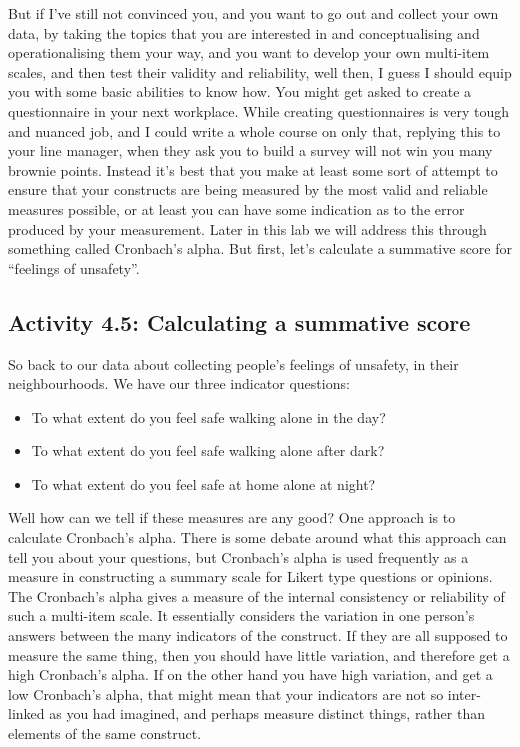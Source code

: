 \documentclass[
]{book}
\providecommand{\tightlist}{%
  \setlength{\itemsep}{0pt}\setlength{\parskip}{0pt}}
\begin{document}
But if I've still not convinced you, and you want to go out and collect your own data, by taking the topics that you are interested in and conceptualising and operationalising them your way, and you want to develop your own multi-item scales, and then test their validity and reliability, well then, I guess I should equip you with some basic abilities to know how. You might get asked to create a questionnaire in your next workplace. While creating questionnaires is very tough and nuanced job, and I could write a whole course on only that, replying this to your line manager, when they ask you to build a survey will not win you many brownie points. Instead it's best that you make at least some sort of attempt to ensure that your constructs are being measured by the most valid and reliable measures possible, or at least you can have some indication as to the error produced by your measurement. Later in this lab we will address this through something called Cronbach's alpha. But first, let's calculate a summative score for ``feelings of unsafety''.

\hypertarget{activity-4.5-calculating-a-summative-score}{%
\subsection{Activity 4.5: Calculating a summative score}\label{activity-4.5-calculating-a-summative-score}}

So back to our data about collecting people's feelings of unsafety, in their neighbourhoods. We have our three indicator questions:

\begin{itemize}
\tightlist
\item
  To what extent do you feel safe walking alone in the day?
\item
  To what extent do you feel safe walking alone after dark?
\item
  To what extent do you feel safe at home alone at night?
\end{itemize}

Well how can we tell if these measures are any good? One approach is to calculate Cronbach's alpha. There is some debate around what this approach can tell you about your questions, but Cronbach's alpha is used frequently as a measure in constructing a summary scale for Likert type questions or opinions. The Cronbach's alpha gives a measure of the internal consistency or reliability of such a multi-item scale. It essentially considers the variation in one person's answers between the many indicators of the construct. If they are all supposed to measure the same thing, then you should have little variation, and therefore get a high Cronbach's alpha. If on the other hand you have high variation, and get a low Cronbach's alpha, that might mean that your indicators are not so inter-linked as you had imagined, and perhaps measure distinct things, rather than elements of the same construct.
\end{document}
